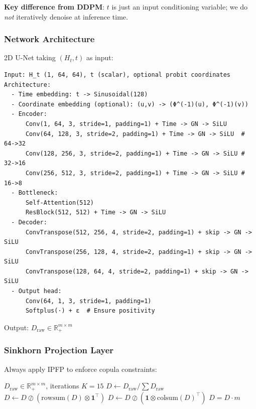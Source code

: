 \documentclass[11pt]{article}
\begin{document}
\textbf{Key difference from DDPM}: $t$ is just an input conditioning variable; we do \emph{not} iteratively denoise at inference time.

\subsubsection{Network Architecture}

2D U-Net taking $(H_t, t)$ as input:
\begin{verbatim}
Input: H_t (1, 64, 64), t (scalar), optional probit coordinates
Architecture:
  - Time embedding: t -> Sinusoidal(128)
  - Coordinate embedding (optional): (u,v) -> (Φ^(-1)(u), Φ^(-1)(v))
  - Encoder:
      Conv(1, 64, 3, stride=1, padding=1) + Time -> GN -> SiLU
      Conv(64, 128, 3, stride=2, padding=1) + Time -> GN -> SiLU  # 64->32
      Conv(128, 256, 3, stride=2, padding=1) + Time -> GN -> SiLU # 32->16
      Conv(256, 512, 3, stride=2, padding=1) + Time -> GN -> SiLU # 16->8
  - Bottleneck:
      Self-Attention(512)
      ResBlock(512, 512) + Time -> GN -> SiLU
  - Decoder:
      ConvTranspose(512, 256, 4, stride=2, padding=1) + skip -> GN -> SiLU
      ConvTranspose(256, 128, 4, stride=2, padding=1) + skip -> GN -> SiLU
      ConvTranspose(128, 64, 4, stride=2, padding=1) + skip -> GN -> SiLU
  - Output head:
      Conv(64, 1, 3, stride=1, padding=1)
      Softplus(·) + ε  # Ensure positivity
\end{verbatim}

Output: $D_{\text{raw}} \in \mathbb{R}^{m \times m}_+$

\subsubsection{Sinkhorn Projection Layer}

Always apply IPFP to enforce copula constraints:
\begin{algorithm}[H]
\caption{Sinkhorn Projection}
\begin{algorithmic}[1]
\REQUIRE $D_{\text{raw}} \in \mathbb{R}^{m \times m}_+$, iterations $K=15$
\STATE $D \gets D_{\text{raw}} / \sum D_{\text{raw}}$ 
    \STATE $D \gets D \oslash (\text{rowsum}(D) \otimes \mathbf{1}^\top)$ 
    \STATE $D \gets D \oslash (\mathbf{1} \otimes \text{colsum}(D)^\top)$ 
\ENDFOR
\RETURN $\hat{D} = D \cdot m$ 
\end{algorithmic}
\end{algorithm}
\end{document}
